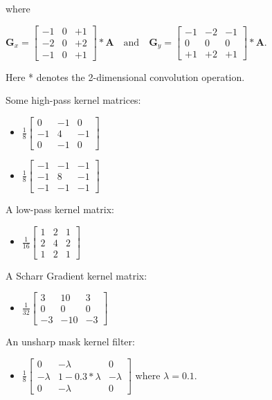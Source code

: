 \documentclass[12pt]{amsart}
\theoremstyle{definition}
\theoremstyle{remark}
\numberwithin{thm}{section}
\begin{document}
where

$\mathbf{G}_x = \begin{bmatrix} 
 -1 & 0 & +1  \\
-2 & 0 & +2 \\
-1 & 0 & +1 
\end{bmatrix} * \mathbf{A}
\quad
\mbox{and}
\quad   
\mathbf{G}_y = \begin{bmatrix} 
-1 & -2 & -1 \\
 0 & 0 & 0 \\
+1 & +2 & +1
\end{bmatrix} * \mathbf{A}$.

Here * denotes the 2-dimensional convolution operation.

Some high-pass kernel matrices:
\begin{itemize}
\item
$
\frac{1}{8}
\begin{bmatrix}
0 & -1 & 0\\
-1 & 4 & -1\\
0 & -1 & 0
\end{bmatrix}$
\item
$
\frac{1}{8}
\begin{bmatrix}
-1 & -1 & -1\\
-1 & 8 & -1\\
-1 & -1 & -1
\end{bmatrix}$
\end{itemize}

A low-pass kernel matrix:
\begin{itemize}
\item
$
\frac{1}{16}
\begin{bmatrix}
1 & 2 & 1\\
2 & 4 & 2\\
1 & 2 & 1
\end{bmatrix}$
\end{itemize}

A Scharr Gradient kernel matrix:
\begin{itemize}
\item
$
\frac{1}{32}
\begin{bmatrix}
3 & 10 & 3\\
0 & 0 & 0\\
-3 & -10 & -3
\end{bmatrix}$
\end{itemize}

An unsharp mask kernel filter:
\begin{itemize}
\item
$
\frac{1}{8}
\begin{bmatrix}
0 &-\lambda &0\\
-\lambda &1-0.3*\lambda &-\lambda\\
0 &-\lambda &0
\end{bmatrix}
$
where $\lambda=0.1$.
\end{itemize}
\end{document}

